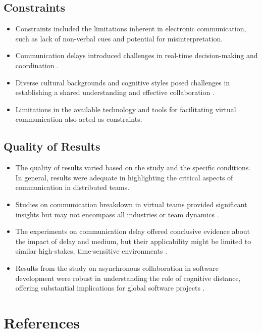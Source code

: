 \documentclass[12pt]{article}
\begin{document}
\subsection{Constraints}
\begin{itemize}
  \item Constraints included the limitations inherent in electronic communication, such as lack of non-verbal cues and potential for misinterpretation.
  \item Communication delays introduced challenges in real-time decision-making and coordination \cite{ref2}.
  \item Diverse cultural backgrounds and cognitive styles posed challenges in establishing a shared understanding and effective collaboration \cite{ref1, ref3}.
  \item Limitations in the available technology and tools for facilitating virtual communication also acted as constraints.
\end{itemize}

\subsection{Quality of Results}
\begin{itemize}
  \item The quality of results varied based on the study and the specific conditions. In general, results were adequate in highlighting the critical aspects of communication in distributed teams.
  \item Studies on communication breakdown in virtual teams provided significant insights but may not encompass all industries or team dynamics \cite{ref1}.
  \item The experiments on communication delay offered conclusive evidence about the impact of delay and medium, but their applicability might be limited to similar high-stakes, time-sensitive environments \cite{ref2}.
  \item Results from the study on asynchronous collaboration in software development were robust in understanding the role of cognitive distance, offering substantial implications for global software projects \cite{ref3}.
\end{itemize}


\section*{References}
\vspace*{-35pt}
\renewcommand{\refname}{}
\end{document}
